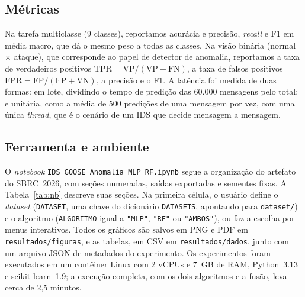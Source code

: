 \documentclass[12pt]{article}
\begin{document}
\subsection{Métricas}

Na tarefa multiclasse (9 classes), reportamos acurácia e precisão,
\textit{recall} e F1 em média macro, que dá o mesmo peso a todas as classes.
Na visão binária (normal $\times$ ataque), que corresponde ao papel de detector
de anomalia, reportamos a taxa de verdadeiros positivos
$\mathrm{TPR}=\mathrm{VP}/(\mathrm{VP}+\mathrm{FN})$, a taxa de falsos
positivos $\mathrm{FPR}=\mathrm{FP}/(\mathrm{FP}+\mathrm{VN})$, a precisão e o
F1. A latência foi medida de duas formas: em lote, dividindo o tempo de
predição das 60.000 mensagens pelo total; e unitária, como a média de 500
predições de uma mensagem por vez, com uma única \textit{thread}, que é o cenário
de um IDS que decide mensagem a mensagem.

\subsection{Ferramenta e ambiente}

O \textit{notebook} \texttt{IDS\_GOOSE\_Anomalia\_MLP\_RF.ipynb} segue a
organização do artefato do SBRC~2026, com seções numeradas, saídas
exportadas e sementes fixas. A Tabela~\ref{tab:nb} descreve suas seções. Na
primeira célula, o usuário define o \textit{dataset} (\texttt{DATASET}, uma chave do
dicionário \texttt{DATASETS}, apontando para \texttt{dataset/}) e o algoritmo
(\texttt{ALGORITMO} igual a \texttt{"MLP"}, \texttt{"RF"} ou \texttt{"AMBOS"}),
ou faz a escolha por menus interativos. Todos os gráficos são salvos em PNG e
PDF em \texttt{resultados/figuras}, e as tabelas, em CSV em
\texttt{resultados/dados}, junto com um arquivo JSON de metadados do
experimento. Os experimentos foram executados em um contêiner Linux com 2 vCPUs
e 7~GB de RAM, Python~3.13 e scikit-learn~1.9; a execução completa, com os dois
algoritmos e a fusão, leva cerca de 2,5 minutos.
\end{document}
